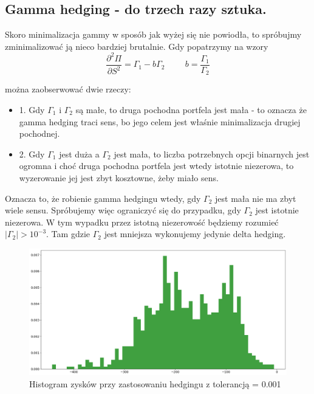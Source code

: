 \documentclass[12pt]{article}
\begin{document}
\subsection{Gamma hedging - do trzech razy sztuka.}

Skoro minimalizacja gammy w sposób jak wyżej się nie powiodła, to spróbujmy zminimalizować ją nieco bardziej brutalnie. Gdy popatrzymy na wzory 
$$
\frac{\partial^2 \Pi}{\partial S^2} = \Gamma_1 - b\Gamma_2 \hspace{1cm} b = \frac{\Gamma_1}{\Gamma_2}
$$

można zaobserwować dwie rzeczy:
\begin{itemize}
    \item 1. Gdy $\Gamma_1$ i $\Gamma_2$ są małe, to druga pochodna portfela jest mała - to oznacza że gamma hedging traci sens, bo jego celem jest właśnie minimalizacja drugiej pochodnej.
    \item 2. Gdy $\Gamma_1$ jest duża a $\Gamma_2$ jest mała, to liczba potrzebnych opcji binarnych jest ogromna i choć druga pochodna portfela jest wtedy istotnie niezerowa, to wyzerowanie jej jest zbyt kosztowne, żeby miało sens.
\end{itemize}
Oznacza to, że robienie gamma hedgingu wtedy, gdy $\Gamma_2$ jest mała nie ma zbyt wiele sensu. Spróbujemy więc ograniczyć się do przypadku, gdy $\Gamma_2$ jest istotnie niezerowa. W tym wypadku przez istotną niezerowość będziemy rozumieć $|\Gamma_2| > 10^{-3}$. Tam gdzie $\Gamma_2$ jest mniejsza wykonujemy jedynie delta hedging. 

\begin{figure}[H]
    \centering
    \includegraphics[width=\textwidth,height=\textheight,keepaspectratio]{gammaztolerka.png}
    \caption{Histogram zysków przy zastosowaniu hedgingu z tolerancją = 0.001}
    \label{fig:gammaztolerką}
\end{figure}
\end{document}
